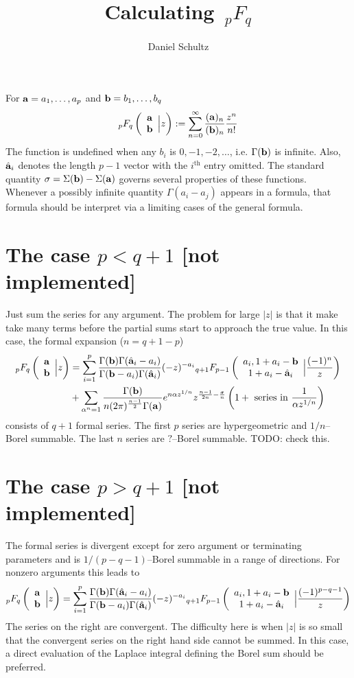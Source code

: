 \documentclass[10pt]{article}
\author{Daniel Schultz}
\title{Calculating $\, _{p}F_{q}$}
\date{}
\newcommand{\F}[5] {{}_{#1}F_{#2} \left( \begin{array}{c} #3 \\ #4 \end{array} \Big| #5  \right)}
\begin{document}
\maketitle

For $\bold{a}=a_1,\dots,a_p$ and  $\bold{b}=b_1,\dots,b_q$
\begin{equation}
\label{Fdef}
\F{p}{q}{\bold{a}}{\bold{b}}{z} := \sum_{n=0}^{\infty} \frac{(\bold{a})_n}{(\bold{b})_n} \frac{z^n}{n!}
\end{equation}
The function is undefined when any $b_i$ is $0,-1,-2,\dots$, i.e. $\Gamma(\bold{b})$ is infinite. Also, $\hat{\bold{a}}_i$ denotes the length $p-1$ vector with the $i^{\text{th}}$ entry omitted. The standard quantity
$\sigma = \Sigma(\bold{b}) - \Sigma(\bold{a})$ governs several properties of these functions. Whenever a possibly infinite quantity $\Gamma(a_i-a_j)$ appears in a formula, that formula should be interpret via a limiting cases of the general formula.

\section{The case $p < q+1$ [not implemented]}
Just sum the series for any argument. The problem for large $|z|$ is that it make take many terms before the partial sums start to approach the true value.
In this case, the formal expansion ($n = q+1-p$)
\begin{align*}
\F{p}{q}{\bold{a}}{\bold{b}}{z}&=\sum_{i=1}^{p} \frac{\Gamma(\bold{b}) \Gamma(\hat{\bold{a}}_i-a_i)}{\Gamma(\bold{b}-a_i) \Gamma(\hat{\bold{a}}_i)} (-z)^{-a_i} \F{q+1}{p-1}{a_i,1+a_i-\bold{b}}{1+a_i-\hat{\bold{a}}_i}{\frac{(-1)^n}{z}}\\
&+\sum_{\alpha^n=1} \frac{\Gamma(\bold{b})}{n (2 \pi )^{\frac{n-1}{2}} \Gamma(\bold{a})} e^{n \alpha z^{1/n}} z^{\frac{n-1}{2 n}-\frac{\sigma
   }{n}}\left(1 + \text{ series in } \frac{1}{\alpha z^{1/n}} \right)
\end{align*}
consists of $q+1$ formal series. The first $p$ series are hypergeometric and $1/n$--Borel summable. The last $n$ series are $?$--Borel summable. TODO: check this.



\section{The case $p > q+1$ [not implemented]}
The formal series is divergent except for zero argument or terminating parameters and is $1/(p-q-1)$--Borel summable in a range of directions. For nonzero arguments this leads to
\begin{equation*}
\F{p}{q}{\bold{a}}{\bold{b}}{z} = \sum_{i=1}^{p} \frac{\Gamma(\bold{b}) \Gamma(\hat{\bold{a}}_i-a_i)}{\Gamma(\bold{b}-a_i) \Gamma(\hat{\bold{a}}_i)} (-z)^{-a_i} \F{q+1}{p-1}{a_i,1+a_i-\bold{b}}{1+a_i-\hat{\bold{a}}_i}{\frac{(-1)^{p-q-1}}{z}}
\end{equation*}
The series on the right are convergent. The difficulty here is when $|z|$ is so small that the convergent series on the right hand side cannot be summed. In this case, a direct evaluation of the Laplace integral defining the Borel sum should be preferred.
\end{document}
